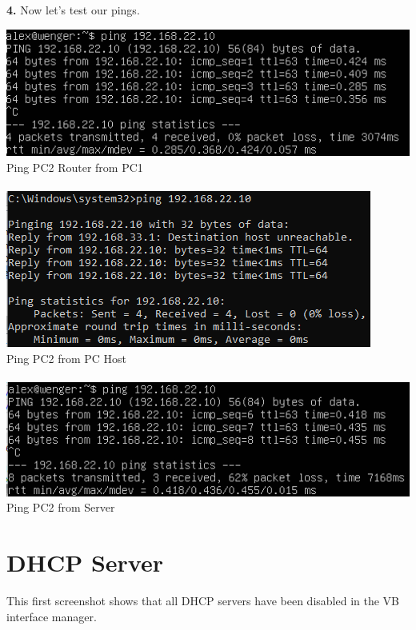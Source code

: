 \documentclass[12pt]{extarticle}
\begin{document}
\textbf{4.} Now let's test our pings.\\
\begin{center}
\includegraphics[scale=0.8]{resources/2-4-1.png}\\
Ping PC2 Router from PC1\\~\\
\includegraphics[scale=0.8]{resources/2-4-2.png}\\
Ping PC2 from PC Host\\~\\
\includegraphics[scale=0.8]{resources/2-4-3.png}\\
Ping PC2 from Server
\end{center}

\section{DHCP Server}
This first screenshot shows that all DHCP servers have been disabled in the VB interface manager.\\
\end{document}
